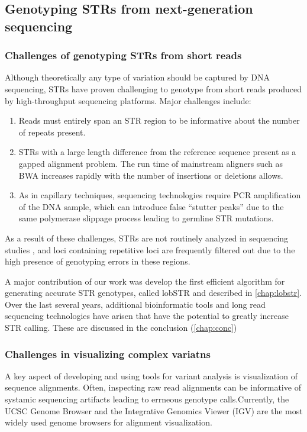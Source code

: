 \subsection{Genotyping STRs from next-generation sequencing}
\subsubsection{Challenges of genotyping STRs from short reads}
Although theoretically any type of variation should be captured by DNA sequencing, STRs have proven challenging to genotype from short reads produced by high-throughput sequencing platforms. Major challenges include:
\begin{enumerate}
\item Reads must entirely span an STR region to be informative about the number of repeats present.
\item STRs with a large length difference from the reference sequence present as a gapped alignment problem. The run time of mainstream aligners such as BWA \cite{LiDurbin2009a} increases rapidly  with the number of insertions or deletions allows.
\item As in capillary techniques, sequencing technologies require PCR amplification of the DNA sample, which can introduce false ``stutter peaks'' due to the same polymerase slippage process leading to germline STR mutations.
\end{enumerate}
As a result of these challenges, STRs are not routinely analyzed in sequencing studies \cite{TreangenSalzberg2012}, and loci containing repetitive loci are frequently filtered out due to the high presence of genotyping errors in these regions.

A major contribution of our work was develop the first efficient algorithm for generating accurate STR genotypes, called lobSTR \cite{GymrekGolanRossetEtAl2012} and described in \autoref{chap:lobstr}. Over the last several years, additional bioinformatic tools and long read sequencing technologies have arisen that have the potential to greatly increase STR calling. These are discussed in the conclusion (\autoref{chap:conc})

\subsubsection{Challenges in visualizing complex variatns}
A key aspect of developing and using tools for variant analysis is visualization of sequence alignments. Often, inspecting raw read alignments can be informative of systamic sequencing artifacts leading to errneous genotype calls.Currently, the UCSC Genome Browser \cite{KentSugnetFureyEtAl2002} and the Integrative Genomics Viewer (IGV) \cite{RobinsonThorvaldsdottirWincklerEtAl2011} are the most widely used genome browsers for alignment visualization.

